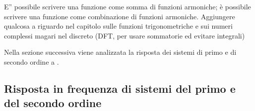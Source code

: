 \documentclass[letterpaper,10pt,italian]{jupyterBook}
\begin{document}
\sphinxAtStartPar
{} {\hyperref[\detokenize{ch/todo:math-hs-todo-fourier}]{}} E” possibile scrivere una funzione come somma di funzioni armoniche; è possibile scrivere una funzione come combinazione di funzioni armoniche. Aggiungere qualcosa a riguardo nel capitolo sulle funzioni trigonometriche e sui numeri complessi \sphinxhyphen{} magari nel discreto (DFT, per usare sommatorie ed evitare integrali)

\sphinxAtStartPar
Nella sezione successiva viene analizzata la risposta dei sistemi di primo e di secondo ordine a .


\subsection{Risposta in frequenza di sistemi del primo e del secondo ordine}
\label{\detokenize{ch/ode-lti:risposta-in-frequenza-di-sistemi-del-primo-e-del-secondo-ordine}}\label{\detokenize{ch/ode-lti:ode-lti-frequency-response}}
\end{document}
